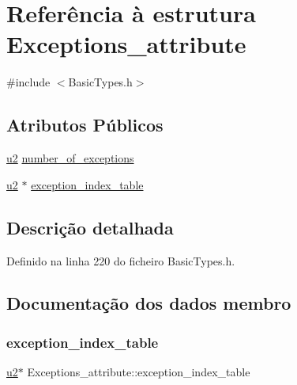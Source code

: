 \hypertarget{structExceptions__attribute}{}\section{Referência à estrutura Exceptions\+\_\+attribute}
\label{structExceptions__attribute}


{\ttfamily \#include $<$Basic\+Types.\+h$>$}

\subsection*{Atributos Públicos}
\begin{DoxyCompactItemize}
\item 
\hyperlink{BasicTypes_8h_a732cde1300aafb73b0ea6c2558a7a54f}{u2} \hyperlink{structExceptions__attribute_af9f38fbc43eadcb56658f90e8743c90b}{number\+\_\+of\+\_\+exceptions}
\item 
\hyperlink{BasicTypes_8h_a732cde1300aafb73b0ea6c2558a7a54f}{u2} $\ast$ \hyperlink{structExceptions__attribute_a85a01c4ef477cf86cd0dc099eee2b08d}{exception\+\_\+index\+\_\+table}
\end{DoxyCompactItemize}


\subsection{Descrição detalhada}


Definido na linha 220 do ficheiro Basic\+Types.\+h.



\subsection{Documentação dos dados membro}
\mbox{\label{structExceptions__attribute_a85a01c4ef477cf86cd0dc099eee2b08d}} 
\subsubsection{\texorpdfstring{exception\+\_\+index\+\_\+table}{exception\_index\_table}}
{\footnotesize\ttfamily \hyperlink{BasicTypes_8h_a732cde1300aafb73b0ea6c2558a7a54f}{u2}$\ast$ Exceptions\+\_\+attribute\+::exception\+\_\+index\+\_\+table}



